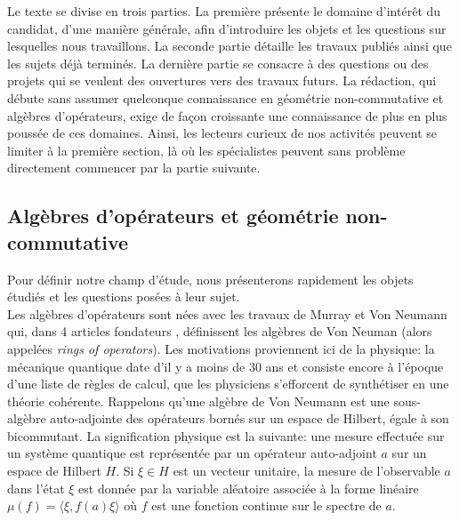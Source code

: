 \documentclass[a4paper,11pt]{article}
\begin{document}
Le texte se divise en trois parties. La premi\`ere pr\'esente le domaine d'int\'er\^et du candidat, d'une mani\`ere g\'en\'erale, afin d'introduire les objets et les questions sur lesquelles nous travaillons. La seconde partie d\'etaille les travaux publi\'es ainsi que les sujets d\'ej\`a termin\'es. La derni\`ere partie se consacre \`a des questions ou des projets qui se veulent des ouvertures vers des travaux futurs. La r\'edaction, qui d\'ebute sans assumer quelconque connaissance en g\'eom\'etrie non-commutative et alg\`ebres d'op\'erateurs, exige de fa\c{c}on croissante une connaissance de plus en plus pouss\'ee de ces domaines. Ainsi, %
les lecteurs curieux de nos activit\'es peuvent se limiter \`a la premi\`ere section, l\`a o\`u les sp\'ecialistes peuvent sans probl\`eme directement commencer par la partie suivante.

\subsection*{Alg\`ebres d'op\'erateurs et g\'eom\'etrie non-commutative}

Pour d\'efinir notre champ d'\'etude, nous pr\'esenterons rapidement les objets \'etudi\'es et les questions pos\'ees \`a leur sujet.\\

Les alg\`ebres d'op\'erateurs sont n\'ees avec les travaux de Murray et Von Neumann qui, dans 4 articles fondateurs \cite{murray1936rings}, d\'efinissent les alg\`ebres de Von Neuman (alors appel\'ees \textit{rings of operators}). Les motivations proviennent ici de la physique: la m\'ecanique quantique date d'il y a moins de 30 ans et consiste encore \`a l'\'epoque d'une liste de r\`egles de calcul, que les physiciens s'efforcent de synth\'etiser en une th\'eorie coh\'erente. Rappelons qu'une alg\`ebre de Von Neumann est une sous-alg\`ebre auto-adjointe des op\'erateurs born\'es sur un espace de  Hilbert, \'egale \`a son bicommutant. La signification physique est la suivante: une mesure effectu\'ee sur un syst\`eme quantique est repr\'esent\'ee par un op\'erateur auto-adjoint $a$ sur un espace de Hilbert $H$. Si $\xi \in H$ est un vecteur unitaire, la mesure de l'observable $a$ dans l'\'etat $\xi$ est donn\'ee par la variable al\'eatoire associ\'ee \`a la forme lin\'eaire $\mu(f) = \langle \xi , f(a) \xi \rangle$ o\`u $f$ est une fonction continue sur le spectre de $a$.  \\
\end{document}
